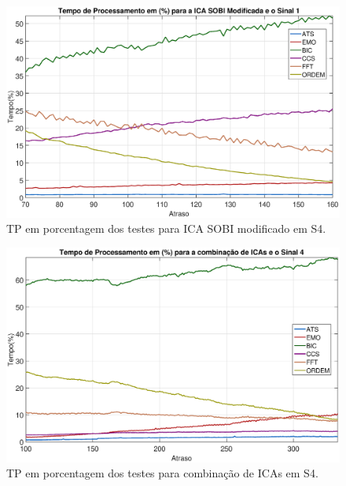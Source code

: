 \documentclass[a4paper,12pt]{monografia}
\theoremstyle{plain}
\theoremstyle{definition}
\theoremstyle{remark}
\begin{document}
\begin{figure}[!htb]
    \begin{center}
    \advance\leftskip -1.5cm
    \includegraphics[scale=0.45]{imagens/ImagensParaOAnexo/TPPAICASOBImodSinal1.eps}
    \caption{TP em porcentagem dos testes para ICA SOBI modificado em S4.}
    \label{fig:TPSMAS4}    
    \end{center}
\end{figure}

\begin{figure}[!htb]
    \begin{center}
    \advance\leftskip -1.5cm
    \includegraphics[scale=0.45]{imagens/ImagensParaOAnexo/TPPACombinacaoICASinal4.eps}
    \caption{TP em porcentagem dos testes para combinação de ICAs em S4.}
    \label{fig:TPCIAS4}    
    \end{center}
\end{figure}
\end{document}
